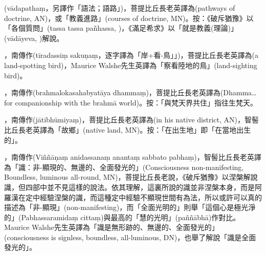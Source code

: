 \startitemgroup[noteitems]
\item{}(vādapathaṃ，另譯作「語法；語路」)，菩提比丘長老英譯為(pathways of doctrine, AN)，或「教義進路」(courses of doctrine, MN)。按：《破斥猶豫》以「各個質問」(tassa tassa pañhassa, )，《滿足希求》以「就是教義(理論)」(vādāyeva, )解說。
\stopitemgroup

\startitemgroup[noteitems]
\item{}，南傳作(tīradassiṃ sakuṇaṃ，逐字譯為「岸+看-鳥」」)，菩提比丘長老英譯為(a land-spotting bird)，Maurice Walshe先生英譯為「察看陸地的鳥」(land-sighting bird)。
\stopitemgroup

\startitemgroup[noteitems]
\item{}，南傳作(brahmalokasahabyatāya dhammaṃ)，菩提比丘長老英譯為(Dhamma…for companionship with the brahmā world)。按：「與梵天界共住」指往生梵天。
\stopitemgroup

\startitemgroup[noteitems]
\item{}，南傳作(jātibhūmiyaṃ)，菩提比丘長老英譯為(in his native district, AN)，智髻比丘長老英譯為「故鄉」(native land, MN)。按：「在出生地」即「在當地出生的」。
\stopitemgroup

\startitemgroup[noteitems]
\item{}，南傳作(Viññāṇaṃ anidassanaṃ anantaṃ sabbato pabhaṃ)，智髻比丘長老英譯為「識：非-顯現的、無邊的、全面發光的」(Consciousness non-manifesting, Boundless, luminous all-round, MN)，菩提比丘長老說，《破斥猶豫》以涅槃解說識，但四部中並不見這樣的說法。依其理解，這裏所說的識並非涅槃本身，而是阿羅漢在定中經驗涅槃的識，而這種定中經驗不顯現世間有為法，所以或許可以真的描述為「非-顯現」(non-manifesting)，而「全面光明的」則舉「這個心是極光淨的」(Pabhassaramidaṃ cittaṃ)與最高的「慧的光明」(paññābhā)作對比。Maurice Walshe先生英譯為「識是無形跡的、無邊的、全面發光的」(consciousness is signless, boundless, all-luminous, DN)，也舉了解說「識是全面發光的」。
\stopitemgroup


